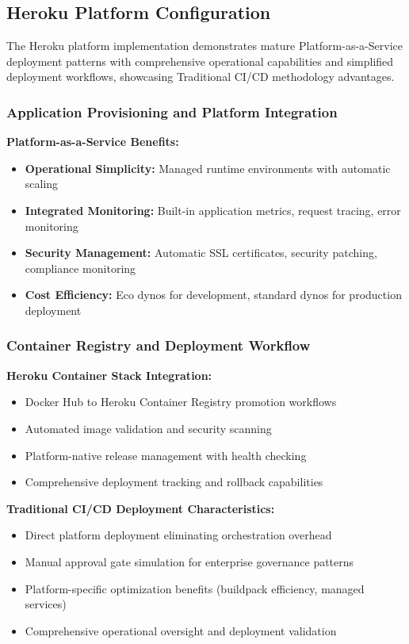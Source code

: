 \subsection{Heroku Platform Configuration}

The Heroku platform implementation demonstrates mature Platform-as-a-Service deployment patterns with comprehensive operational capabilities and simplified deployment workflows, showcasing Traditional CI/CD methodology advantages.

\subsubsection{Application Provisioning and Platform Integration}



\textbf{Platform-as-a-Service Benefits:}
\begin{itemize}
\item \textbf{Operational Simplicity:} Managed runtime environments with automatic scaling
\item \textbf{Integrated Monitoring:} Built-in application metrics, request tracing, error monitoring
\item \textbf{Security Management:} Automatic SSL certificates, security patching, compliance monitoring
\item \textbf{Cost Efficiency:} Eco dynos for development, standard dynos for production deployment
\end{itemize}

\subsubsection{Container Registry and Deployment Workflow}

\textbf{Heroku Container Stack Integration:}
\begin{itemize}
\item Docker Hub to Heroku Container Registry promotion workflows
\item Automated image validation and security scanning
\item Platform-native release management with health checking
\item Comprehensive deployment tracking and rollback capabilities
\end{itemize}

\textbf{Traditional CI/CD Deployment Characteristics:}
\begin{itemize}
\item Direct platform deployment eliminating orchestration overhead
\item Manual approval gate simulation for enterprise governance patterns
\item Platform-specific optimization benefits (buildpack efficiency, managed services)
\item Comprehensive operational oversight and deployment validation
\end{itemize}

